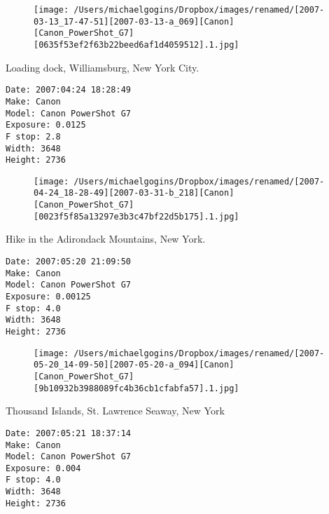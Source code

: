 \documentclass[11pt,letter,DIV=14,paper=landscape]{scrbook}
\begin{document}
\begin{figure}
\texttt{[image: /Users/michaelgogins/Dropbox/images/renamed/[2007-03-13\_17-47-51][2007-03-13-a\_069][Canon][Canon\_PowerShot\_G7][0635f53ef2f63b22beed6af1d4059512].1.jpg]}
\end{figure}
    
\clearpage
\noindent Loading dock, Williamsburg, New York City.
\noindent
\begin{lstlisting}
Date: 2007:04:24 18:28:49
Make: Canon
Model: Canon PowerShot G7
Exposure: 0.0125
F stop: 2.8
Width: 3648
Height: 2736
\end{lstlisting}
\clearpage

\begin{figure}
\texttt{[image: /Users/michaelgogins/Dropbox/images/renamed/[2007-04-24\_18-28-49][2007-03-31-b\_218][Canon][Canon\_PowerShot\_G7][0023f5f85a13297e3b3c47bf22d5b175].1.jpg]}
\end{figure}
    
\clearpage
\noindent Hike in the Adirondack Mountains, New York.
\noindent
\begin{lstlisting}
Date: 2007:05:20 21:09:50
Make: Canon
Model: Canon PowerShot G7
Exposure: 0.00125
F stop: 4.0
Width: 3648
Height: 2736
\end{lstlisting}
\clearpage

\begin{figure}
\texttt{[image: /Users/michaelgogins/Dropbox/images/renamed/[2007-05-20\_14-09-50][2007-05-20-a\_094][Canon][Canon\_PowerShot\_G7][9b10932b3988089fc4b36cb1cfabfa57].1.jpg]}
\end{figure}
    
\clearpage
\noindent Thousand Islands, St. Lawrence Seaway, New York
\noindent
\begin{lstlisting}
Date: 2007:05:21 18:37:14
Make: Canon
Model: Canon PowerShot G7
Exposure: 0.004
F stop: 4.0
Width: 3648
Height: 2736
\end{lstlisting}
\clearpage
\end{document}
